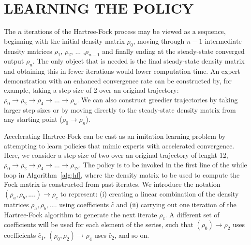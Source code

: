\documentclass[twoside,11pt]{article}
\begin{document}
\section{LEARNING THE POLICY} \label{sec:policy}


The $n$ iterations of the Hartree-Fock process may be viewed as a sequence, beginning with the initial density matrix $\rho_0$, moving through $n-1$ intermediate density matrices $\rho_1$,  $\rho_2$,  $\ldots$ ,$\rho_{n-1}$ and finally ending at the steady-state converged output $\rho_{n}$. The only object that is needed is the final steady-state density matrix and obtaining this in fewer iterations would lower computation time. An expert demonstration with an enhanced convergence rate can be constructed by, for example, taking a step size of 2 over an original trajectory: $\rho_0 \rightarrow \rho_2 \rightarrow  \rho_4 \rightarrow  \ldots \rightarrow  \rho_{n}$. We can also construct greedier trajectories by taking larger step sizes or by moving directly to the steady-state density matrix from any starting point ($\rho_0 \rightarrow \rho_{n}$). 

Accelerating Hartree-Fock can be cast as an imitation learning problem by attempting to learn policies that mimic experts with accelerated convergence. Here, we consider a step size of two over an original trajectory of lenght 12, $\rho_0 \rightarrow \rho_2 \rightarrow  \rho_4 \rightarrow  \ldots \rightarrow  \rho_{12}$.  The policy is to be invoked in the first line of the while loop in Algorithm~\ref{alg:hf}, where the density matrix to be used to compute the Fock matrix is constructed from past iterates. We introduce the notation $(\rho_a, \rho_b, ....) \rightarrow \rho_c $ to represent: (i) creating a linear combination of the density matrices $\rho_a, \rho_b, ....$ using coefficients $\hat{c}$ and (ii) carrying out one iteration of the Hartree-Fock algorithm to generate the next iterate $\rho_c$. A different set of coefficients will be used for each element of the series, such that $(\rho_0) \rightarrow \rho_2 $ uses coefficients $\hat{c}_1$, $(\rho_0, \rho_2) \rightarrow \rho_4 $ uses $\hat{c}_2$, and so on. 
\end{document}
